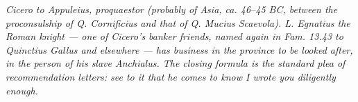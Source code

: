 
\textit{Cicero to Appuleius, proquaestor (probably of Asia, ca.
46--45 BC, between the proconsulship of Q. Cornificius and that of
Q. Mucius Scaevola). L. Egnatius the Roman knight --- one of
Cicero's banker friends, named again in \textit{Fam.} 13.43 to
Quinctius Gallus and elsewhere --- has business in the province
to be looked after, in the person of his slave Anchialus. The
closing formula is the standard plea of recommendation letters:
\textit{see to it that he comes to know I wrote you diligently
enough.}}
